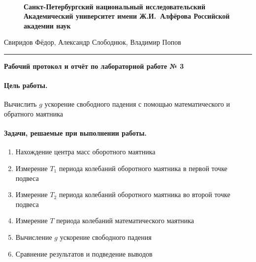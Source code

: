 \documentclass{article}
\begin{document}
	\begin{figure}[!]
\\
{\Large\bfseries Санкт-Петербургский национальный исследовательский Академический университет имени Ж.И.~Алфёрова Российской академии наук}
\end{figure}
\begin{center}
Свиридов Фёдор, Александр Слободнюк, Владимир Попов
\end{center}
\rule{12cm}{0.4mm}
\begin{center}
{\large\textbf{Рабочий протокол и отчёт по лабораторной работе № 3}}
\end{center}


\paragraph{Цель работы.}
Вычислить $g$ ускорение свободного падения с помощью математического
и обратного маятника

\paragraph{Задачи, решаемые при выполнении работы.}
\begin{enumerate}
	\item Нахождение центра масс оборотного маятника
	\item Измерение $ T_1 $ периода колебаний оборотного маятника в первой точке подвеса
	\item Измерение $ T_2 $ периода колебаний оборотного маятника во второй точке подвеса
	\item Измерение $ T$ периода колебаний математического маятника
	\item Вычисление $ g $ ускорение свободного падения
	\item Сравнение результатов и подведение выводов
\end{enumerate}
\end{document}
